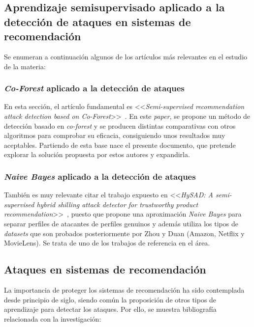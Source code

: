 \subsection{Aprendizaje semisupervisado aplicado a la detección de ataques en sistemas de recomendación}

Se enumeran a continuación algunos de los artículos más relevantes en el estudio de la materia:

\subsubsection{\textit{Co-Forest} aplicado a la detección de ataques~\cite{zhou2021SemisupervisedRecommendationAttack}}
En esta sección, el artículo fundamental es <<\textit{Semi-supervised recommendation attack detection based on Co-Forest}>>~\cite{zhou2021SemisupervisedRecommendationAttack}. En este \textit{paper}, se propone un método de detección basado en \textit{co-forest} y se producen distintas comparativas con otros algoritmos para comprobar su eficacia, consiguiendo unos resultados muy aceptables. Partiendo de esta base nace el presente documento, que pretende explorar la solución propuesta por estos autores y expandirla.

\subsubsection{\textit{Naive Bayes} aplicado a la detección de ataques~\cite{zhiang2012HySADNayveBayes}}
También es muy relevante citar el trabajo expuesto en <<\textit{HySAD: A semi-supervised hybrid shilling attack detector for trustworthy product recommendation}>>~\cite{zhiang2012HySADNayveBayes}, puesto que propone una aproximación \textit{Naive Bayes} para separar perfiles de atacantes de perfiles genuinos y además utiliza los tipos de \textit{datasets} que son probados posteriormente por Zhou y Duan (Amazon, Netflix y MovieLens). Se trata de uno de los trabajos de referencia en el área.

\subsection{Ataques en sistemas de recomendación}

La importancia de proteger los sistemas de recomendación ha sido contemplada desde principio de siglo, siendo común la proposición de otros tipos de aprendizaje para detectar los ataques. Por ello, se muestra bibliografía relacionada con la investigación:

